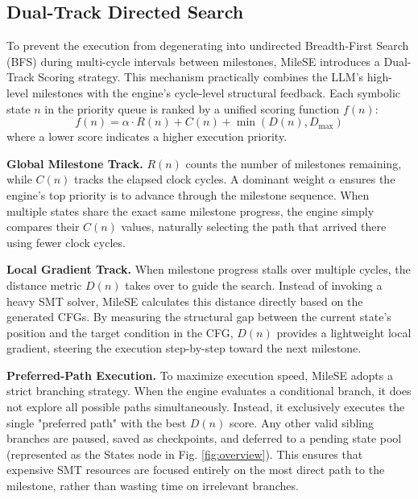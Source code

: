 \documentclass[conference]{IEEEtran}
\begin{document}
\subsection{Dual-Track Directed Search}
To prevent the execution from degenerating into undirected Breadth-First Search (BFS) during multi-cycle intervals between milestones, MileSE introduces a Dual-Track Scoring strategy. This mechanism practically combines the LLM's high-level milestones with the engine's cycle-level structural feedback. Each symbolic state $n$ in the priority queue is ranked by a unified scoring function $f(n)$:
\begin{equation}
    f(n) = \alpha \cdot R(n) + C(n) + \min(D(n), D_{\max})
\end{equation}
where a lower score indicates a higher execution priority.

\textbf{Global Milestone Track.} $R(n)$ counts the number of milestones remaining, while $C(n)$ tracks the elapsed clock cycles. A dominant weight $\alpha$ ensures the engine's top priority is to advance through the milestone sequence. When multiple states share the exact same milestone progress, the engine simply compares their $C(n)$ values, naturally selecting the path that arrived there using fewer clock cycles.

\textbf{Local Gradient Track.} When milestone progress stalls over multiple cycles, the distance metric $D(n)$ takes over to guide the search. Instead of invoking a heavy SMT solver, MileSE calculates this distance directly based on the generated CFGs. By measuring the structural gap between the current state's position and the target condition in the CFG, $D(n)$ provides a lightweight local gradient, steering the execution step-by-step toward the next milestone.

\textbf{Preferred-Path Execution.} To maximize execution speed, MileSE adopts a strict branching strategy. When the engine evaluates a conditional branch, it does not explore all possible paths simultaneously. Instead, it exclusively executes the single "preferred path" with the best $D(n)$ score. Any other valid sibling branches are paused, saved as checkpoints, and deferred to a pending state pool (represented as the States node in Fig. \ref{fig:overview}). This ensures that expensive SMT resources are focused entirely on the most direct path to the milestone, rather than wasting time on irrelevant branches.
\end{document}
